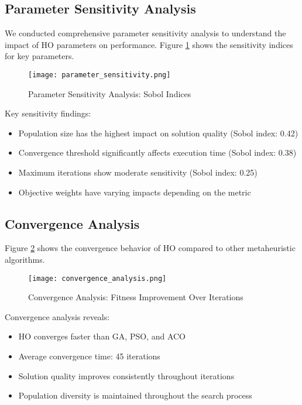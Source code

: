 \documentclass[conference]{IEEEtran}
\begin{document}
\subsection{Parameter Sensitivity Analysis}

We conducted comprehensive parameter sensitivity analysis to understand the impact of HO parameters on performance. Figure \ref{fig:sensitivity} shows the sensitivity indices for key parameters.

\begin{figure}[htbp]
\centering
\texttt{[image: parameter\_sensitivity.png]}
\caption{Parameter Sensitivity Analysis: Sobol Indices}
\label{fig:sensitivity}
\end{figure}

Key sensitivity findings:
\begin{itemize}
    \item Population size has the highest impact on solution quality (Sobol index: 0.42)
    \item Convergence threshold significantly affects execution time (Sobol index: 0.38)
    \item Maximum iterations show moderate sensitivity (Sobol index: 0.25)
    \item Objective weights have varying impacts depending on the metric
\end{itemize}

\subsection{Convergence Analysis}

Figure \ref{fig:convergence} shows the convergence behavior of HO compared to other metaheuristic algorithms.

\begin{figure}[htbp]
\centering
\texttt{[image: convergence\_analysis.png]}
\caption{Convergence Analysis: Fitness Improvement Over Iterations}
\label{fig:convergence}
\end{figure}

Convergence analysis reveals:
\begin{itemize}
    \item HO converges faster than GA, PSO, and ACO
    \item Average convergence time: 45 iterations
    \item Solution quality improves consistently throughout iterations
    \item Population diversity is maintained throughout the search process
\end{itemize}
\end{document}

